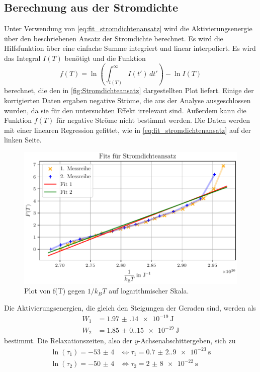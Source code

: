 \subsection{Berechnung aus der Stromdichte}
Unter Verwendung von \autoref{eq:fit_stromdichtenansatz} wird die Aktivierungsenergie über den beschriebenen Ansatz der Stromdichte 
berechnet. Es wird die Hilfsfunktion über eine einfache Summe integriert und linear interpoliert.
Es wird das Integral $I(T)$ benötigt und die Funktion 
\begin{equation}
f(T) = \ln \left( \int_{t(T)}^{\infty} I(t') \, dt' \right) - \ln I(T)
\end{equation}
berechnet, die den in \autoref{fig:Stromdichteansatz} dargestellten Plot liefert. Einige der korrigierten Daten ergaben negative Ströme,
die aus der Analyse ausgeschlossen wurden, da sie für den untersuchten Effekt irrelevant sind.
Außerdem kann die Funktion $f(T)$ für negative Ströme nicht bestimmt werden. Die Daten werden mit einer linearen Regression gefittet, wie in \autoref{eq:fit_stromdichtenansatz} auf der linken Seite.

\begin{figure}[H]
    \centering
    \includegraphics[width=\textwidth]{plots/H_stromdichte.pdf}
    \caption{Plot von f(T) gegen $1/k_BT$ auf logarithmischer Skala.}
    \label{fig:Stromdichteansatz}
\end{figure}

Die Aktivierungsenergien, die gleich den Steigungen der Geraden sind, werden als 
\begin{align*}
W_1   &= \qty{1.97(14)e-19}{\joule}\\
W_2  &= \qty{1.85(0.15)e-19}{\joule}
\end{align*} 
bestimmt.
Die Relaxationszeiten, also der $y$-Achsenabschittergeben, sich zu
\begin{align*}
\ln(\tau_1) = \num{-53(4)} & \Leftrightarrow \tau_1 = \qty{0.7(2.9)e-23}{\second}\\
\ln(\tau_2) = \num{-50(4)} & \Leftrightarrow \tau_2 = \qty{2(8)e-22}{\second}
\end{align*} 


